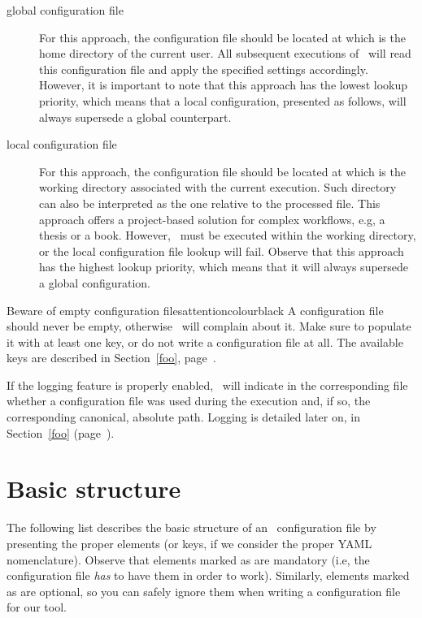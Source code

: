 \begin{description}
\item[global configuration file] For this approach, the configuration file should be located at  which is the home directory of the current user. All subsequent executions of \arara\ will read this configuration file and apply the specified settings accordingly. However, it is important to note that this approach has the lowest lookup priority, which means that a local configuration, presented as follows, will always supersede a global counterpart.

\item[local configuration file] For this approach, the configuration file should be located at  which is the working directory associated with the current execution. Such directory can also be interpreted as the one relative to the processed file. This approach offers a project-based solution for complex workflows, e.g, a thesis or a book. However, \arara\ must be executed within the working directory, or the local configuration file lookup will fail. Observe that this approach has the highest lookup priority, which means that it will always supersede a global configuration.
\end{description}

\begin{messagebox}{Beware of empty configuration files}{attentioncolour}{\icattention}{black}
A configuration file should never be empty, otherwise \arara\ will complain about it. Make sure to populate it with at least one key, or do not write a configuration file at all. The available keys are described in Section~\ref{foo}, page~\pageref{foo}.
\end{messagebox}

If the logging feature is properly enabled, \arara\ will indicate in the corresponding  file whether a configuration file was used during the execution and, if so, the corresponding canonical, absolute path. Logging is detailed later on, in Section~\ref{foo} (page~\pageref{foo}).

\section{Basic structure}
\label{sec:basicstructure}

The following list describes the basic structure of an \arara\ configuration file by presenting the proper elements (or keys, if we consider the proper YAML nomenclature). Observe that elements marked as  are mandatory (i.e, the configuration file \emph{has} to have them in order to work). Similarly, elements marked as  are optional, so you can safely ignore them when writing a configuration file for our tool.

